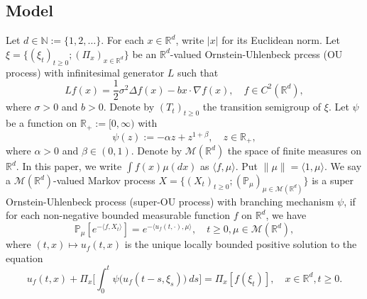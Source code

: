\documentclass[12pt, a4paper]{amsart}
\theoremstyle{definition}
\numberwithin{equation}{section}
\begin{document}
\subsection{Model}
Let $d \in \mathbb N:= \{1,2,\dots\}$.
For each $x\in \mathbb{R}^d$, write $|x|$ for its Euclidean norm.
Let $\xi=\{(\xi_t)_{t\geq 0}; (\Pi_x)_{x\in \mathbb R^d}\}$ be an $\mathbb R^d$-valued Ornstein-Uhlenbeck prcess (OU process) with infinitesimal generator $L$ such that
\begin{equation}
\label{eq: OU generator}
    Lf(x)
    = \frac{1}{2}\sigma^2\Delta f(x)-b x \cdot \nabla f(x),
    \quad f \in C^2(\mathbb{R}^d),
\end{equation}
where $\sigma>0$ and $b>0$.
Denote by $(T_t)_{t\geq 0}$ the transition semigroup of $\xi$.
Let $\psi$ be a function on $\mathbb R_+:= [0,\infty)$ with
\begin{equation}\label{mechanism}
    \psi(z)
    := - \alpha z + z^{1+\beta},
    \quad z \in \mathbb R_+,
\end{equation}
where $\alpha > 0$ and $\beta \in (0,1) $.
Denote by $\mathcal{M}(\mathbb{R}^d)$ the space of finite measures on $\mathbb{R}^d$.
In this paper, we write $\int f(x)\mu(dx)$ as $\langle f,\mu\rangle$. Put $\|\mu\|=\langle 1,\mu\rangle$.
We say a $\mathcal{M}(\mathbb{R}^d)$-valued Markov process $X = \{(X_t)_{t\geq 0}; (\mathbb{P}_{\mu})_{\mu \in \mathcal M(\mathbb R^d)}\}$ is a super Ornstein-Uhlenbeck process (super-OU process) with branching mechanism $\psi$, if for each non-negative bounded measurable function $f$ on $\mathbb{R}^d$, we have
\begin{equation} \label{super}
    \mathbb{P}_{\mu}[e^{-\langle f,X_t \rangle}]
    = e^{-\langle u_f(t,\cdot), \mu \rangle},
    \quad t\geq 0, \mu \in \mathcal M(\mathbb R^d),
\end{equation}
where $(t,x) \mapsto u_f(t,x)$ is the unique locally bounded positive solution to the equation
\begin{equation}\label{eq1}
     u_f(t,x) + \Pi_x \Big[ \int_0^t\psi\big(u_f(t-s, \xi_s)\big)~ds\Big]
     = \Pi_x [f(\xi_t)],
     \quad x\in \mathbb R^d, t\geq 0.
\end{equation}
\end{document}
